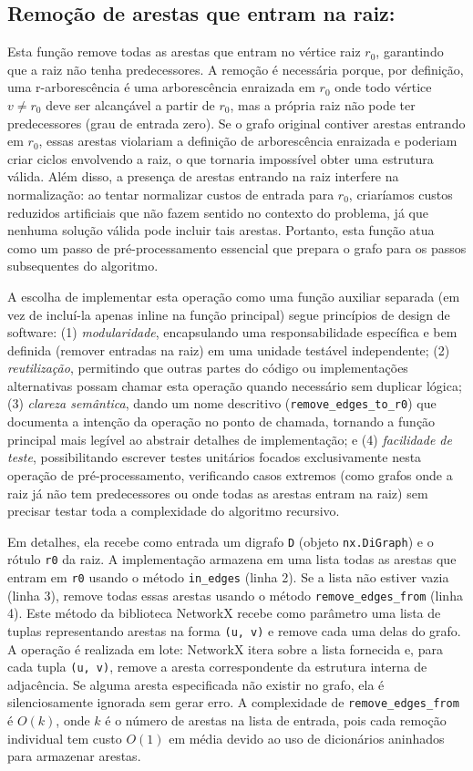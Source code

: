 \subsection{Remoção de arestas que entram na raiz:}
Esta função remove todas as arestas que entram no vértice raiz \(r_0\), garantindo que a raiz não tenha predecessores. A remoção é necessária porque, por definição, uma r-arborescência é uma arborescência enraizada em \(r_0\) onde todo vértice \(v \neq r_0\) deve ser alcançável a partir de \(r_0\), mas a própria raiz não pode ter predecessores (grau de entrada zero). Se o grafo original contiver arestas entrando em \(r_0\), essas arestas violariam a definição de arborescência enraizada e poderiam criar ciclos envolvendo a raiz, o que tornaria impossível obter uma estrutura válida. Além disso, a presença de arestas entrando na raiz interfere na normalização: ao tentar normalizar custos de entrada para \(r_0\), criaríamos custos reduzidos artificiais que não fazem sentido no contexto do problema, já que nenhuma solução válida pode incluir tais arestas. Portanto, esta função atua como um passo de pré-processamento essencial que prepara o grafo para os passos subsequentes do algoritmo.

A escolha de implementar esta operação como uma função auxiliar separada (em vez de incluí-la apenas inline na função principal) segue princípios de design de software: (1) \emph{modularidade}, encapsulando uma responsabilidade específica e bem definida (remover entradas na raiz) em uma unidade testável independente; (2) \emph{reutilização}, permitindo que outras partes do código ou implementações alternativas possam chamar esta operação quando necessário sem duplicar lógica; (3) \emph{clareza semântica}, dando um nome descritivo (\texttt{remove\_edges\_to\_r0}) que documenta a intenção da operação no ponto de chamada, tornando a função principal mais legível ao abstrair detalhes de implementação; e (4) \emph{facilidade de teste}, possibilitando escrever testes unitários focados exclusivamente nesta operação de pré-processamento, verificando casos extremos (como grafos onde a raiz já não tem predecessores ou onde todas as arestas entram na raiz) sem precisar testar toda a complexidade do algoritmo recursivo.

Em detalhes, ela recebe como entrada um digrafo \texttt{D} (objeto \texttt{nx.DiGraph}) e o rótulo \texttt{r0} da raiz. A implementação armazena em uma lista todas as arestas que entram em \texttt{r0} usando o método \texttt{in\_edges} (linha 2). Se a lista não estiver vazia (linha 3), remove todas essas arestas usando o método \texttt{remove\_edges\_from} (linha 4). Este método da biblioteca NetworkX recebe como parâmetro uma lista de tuplas representando arestas na forma \texttt{(u, v)} e remove cada uma delas do grafo. A operação é realizada em lote: NetworkX itera sobre a lista fornecida e, para cada tupla \texttt{(u, v)}, remove a aresta correspondente da estrutura interna de adjacência. Se alguma aresta especificada não existir no grafo, ela é silenciosamente ignorada sem gerar erro. A complexidade de \texttt{remove\_edges\_from} é \(O(k)\), onde \(k\) é o número de arestas na lista de entrada, pois cada remoção individual tem custo \(O(1)\) em média devido ao uso de dicionários aninhados para armazenar arestas.


